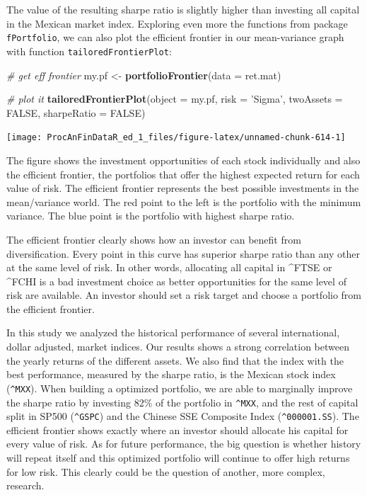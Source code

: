 \documentclass[11pt,]{book}
\newenvironment{Shaded}{\begin{snugshade}}{\end{snugshade}}
\newcommand{\KeywordTok}[1]{\textcolor[rgb]{0.27,0.27,0.27}{\textbf{#1}}}
\newcommand{\DataTypeTok}[1]{\textcolor[rgb]{0.27,0.27,0.27}{#1}}
\newcommand{\StringTok}[1]{\textcolor[rgb]{0.5,0.5,0.5}{#1}}
\newcommand{\CommentTok}[1]{\textcolor[rgb]{0.56,0.35,0.01}{\textit{#1}}}
\newcommand{\OtherTok}[1]{\textcolor[rgb]{0.56,0.35,0.01}{#1}}
\newcommand{\NormalTok}[1]{#1}
\begin{document}
The value of the resulting sharpe ratio is slightly higher than
investing all capital in the Mexican market index. Exploring even more
the functions from package \texttt{fPortfolio}, we can also plot the
efficient frontier in our mean-variance graph with function
\texttt{tailoredFrontierPlot}:

\begin{Shaded}
\begin{Highlighting}[]
\CommentTok{# get eff frontier}
\NormalTok{my.pf <-}\StringTok{ }\KeywordTok{portfolioFrontier}\NormalTok{(}\DataTypeTok{data =}\NormalTok{ ret.mat)}

\CommentTok{# plot it}
\KeywordTok{tailoredFrontierPlot}\NormalTok{(}\DataTypeTok{object =}\NormalTok{ my.pf, }
                     \DataTypeTok{risk =} \StringTok{'Sigma'}\NormalTok{, }
                     \DataTypeTok{twoAssets =} \OtherTok{FALSE}\NormalTok{, }
                     \DataTypeTok{sharpeRatio =} \OtherTok{FALSE}\NormalTok{)}
\end{Highlighting}
\end{Shaded}

\begin{center}\texttt{[image: ProcAnFinDataR\_ed\_1\_files/figure-latex/unnamed-chunk-614-1]} \end{center}

The figure shows the investment opportunities of each stock individually
and also the efficient frontier, the portfolios that offer the highest
expected return for each value of risk. The efficient frontier
represents the best possible investments in the mean/variance world. The
red point to the left is the portfolio with the minimum variance. The
blue point is the portfolio with highest sharpe ratio.

The efficient frontier clearly shows how an investor can benefit from
diversification. Every point in this curve has superior sharpe ratio
than any other at the same level of risk. In other words, allocating all
capital in \^{}FTSE or \^{}FCHI is a bad investment choice as better
opportunities for the same level of risk are available. An investor
should set a risk target and choose a portfolio from the efficient
frontier.

In this study we analyzed the historical performance of several
international, dollar adjusted, market indices. Our results shows a
strong correlation between the yearly returns of the different assets.
We also find that the index with the best performance, measured by the
sharpe ratio, is the Mexican stock index (\texttt{\^{}MXX}). When
building a optimized portfolio, we are able to marginally improve the
sharpe ratio by investing 82\% of the portfolio in \texttt{\^{}MXX}, and
the rest of capital split in SP500 (\texttt{\^{}GSPC}) and the Chinese
SSE Composite Index (\texttt{\^{}000001.SS}). The efficient frontier
shows exactly where an investor should allocate his capital for every
value of risk. As for future performance, the big question is whether
history will repeat itself and this optimized portfolio will continue to
offer high returns for low risk. This clearly could be the question of
another, more complex, research.
\end{document}
